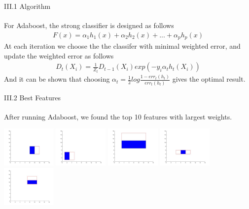 \documentclass[12pt]{article}
\newenvironment{p2}[2][III Adaboost for Classifier Selection]{\begin{trivlist}
\item[\hskip \labelsep {\bfseries #1}\hskip \labelsep {\bfseries #2}]}{\end{trivlist}}
\begin{document}
\begin{p2}{}
\item{III.1 Algorithm\\\\}
For Adaboost, the strong classifier is designed as follows
\begin{align*}
	F(x) = \alpha_1h_1(x) + \alpha_2h_2(x) + ... + \alpha_ph_p(x)
\end{align*}
At each iteration we choose the the classifer with minimal weighted error, and update the weighted error as follows
\begin{align*}
	D_t(X_i) = \frac{1}{Z_t}D_{t-1}(X_i)exp(-y_i\alpha_th_t(X_i))
\end{align*}
And it can be shown that choosing $\alpha_t = \frac{1}{2}log\frac{1-err_t(h_t)}{err_t(h_t)}$ gives the optimal result.
\item{III.2 Best Features\\\\}
After running Adaboost, we found the top 10 features with largest weights.
\begin{center}
		\includegraphics[height=2cm]{features/top1.jpg}
		\includegraphics[height=2cm]{features/top2.jpg}
		\includegraphics[height=2cm]{features/top3.jpg}
		\includegraphics[height=2cm]{features/top4.jpg}
		\includegraphics[height=2cm]{features/top5.jpg}

\end{center}
\end{p2}
\end{document}
